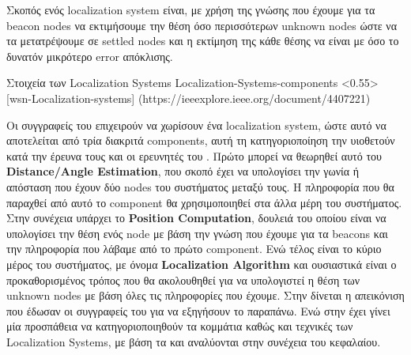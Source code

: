 \begin{table}[H]
    \caption{Ορισμοί ονομάτων των Nodes}
    \label{tab:nodes-names-definition}
	\centering
\end{table}

Σκοπός ενός localization system είναι, με χρήση της γνώσης που έχουμε για τα beacon nodes να εκτιμήσουμε
την θέση όσο περισσότερων unknown nodes ώστε να τα μετατρέψουμε σε settled nodes και η εκτίμηση της κάθε
θέσης να είναι με όσο το δυνατόν μικρότερο error απόκλισης. 

%
{Στοιχεία των Localization Systems}%
{Localization-Systems-components}%
<0.55>%
[wsn-Localization-systems]%
(https://ieeexplore.ieee.org/document/4407221)

Οι συγγραφείς του \cite{wsn-Localization-systems} επιχειρούν να χωρίσουν ένα localization system, ώστε 
αυτό να αποτελείται από τρία διακριτά components, αυτή τη κατηγοριοποίηση την υιοθετούν κατά την έρευνα τους και οι ερευνητές του \cite{localization-systems-components}. Πρώτο μπορεί να θεωρηθεί αυτό του \textbf{Distance/Angle Estimation}, 
που σκοπό έχει να υπολογίσει την γωνία ή απόσταση που έχουν δύο nodes του συστήματος μεταξύ τους.
Η πληροφορία που θα παραχθεί από αυτό το component θα χρησιμοποιηθεί στα άλλα μέρη του συστήματος.
Στην συνέχεια υπάρχει το \textbf{Position Computation}, δουλειά του οποίου είναι να υπολογίσει την θέση ενός
node με βάση την γνώση που έχουμε για τα beacons και την πληροφορία που λάβαμε από το πρώτο component.
Ενώ τέλος είναι το κύριο μέρος του συστήματος, με όνομα \textbf{Localization Algorithm} και ουσιαστικά είναι
ο προκαθορισμένος τρόπος που θα ακολουθηθεί για να υπολογιστεί η θέση των unknown nodes με βάση όλες τις 
πληροφορίες που έχουμε.
Στην  δίνεται η απεικόνιση που έδωσαν οι συγγραφείς του 
\cite{wsn-Localization-systems} για να εξηγήσουν το παραπάνω. Ενώ στην 
έχει γίνει μία προσπάθεια να κατηγοριοποιηθούν τα κομμάτια καθώς και τεχνικές των Localization Systems,
με βάση τα \cite{farooqiazam2016location} \cite{wsn-Localization-systems} \cite{wsn-Localization-techniques}
και αναλύονται στην συνέχεια του κεφαλαίου.

